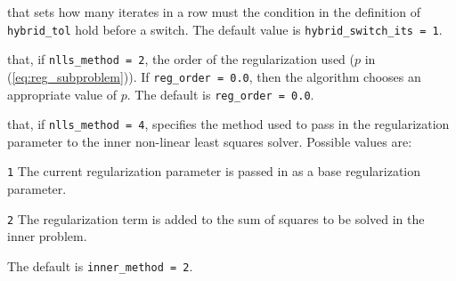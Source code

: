 \begin{description}
that sets how many iterates in a row must the condition in the definition of {\tt hybrid\_tol} hold before a switch.
The default value is {\tt hybrid\_switch\_its = 1}.

that, if {\tt nlls\_method = 2}, the order of the regularization used ($p$ in (\ref{eq:reg_subproblem})).  If {\tt reg\_order = 0.0}, then the algorithm
chooses an appropriate value of $p$. The default is {\tt reg\_order = 0.0}.

that, if {\tt nlls\_method = 4}, specifies the method used to pass in
the regularization parameter to the inner non-linear least squares solver.
Possible values are:
\begin{description}
  \item {\tt 1} The current regularization parameter is passed in as a base regularization parameter.
  \item {\tt 2} The regularization term is added to the sum of squares to be solved in the inner problem.
\end{description}
The default is {\tt inner\_method = 2}.


\end{description}


